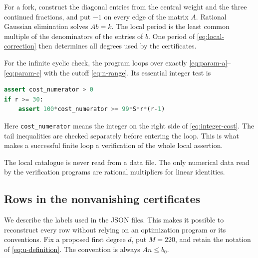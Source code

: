 \documentclass[12pt,a4paper]{article}
\numberwithin{equation}{section}
\theoremstyle{definition}
\begin{document}
For a fork, construct the diagonal entries from the central weight
and the three continued fractions, and put \(-1\) on every edge of
the matrix \(A\). Rational Gaussian elimination solves \(Ab=k\).
The local period is the least common multiple of the denominators
of the entries of \(b\). One period of
\eqref{eq:local-correction} then determines all degrees used by
the certificates.

For the infinite cyclic check, the program loops over exactly
\eqref{eq:param-a}--\eqref{eq:param-c} with the cutoff
\eqref{eq:n-range}. Its essential integer test is
\begin{lstlisting}[language=Python]
assert cost_numerator > 0
if r >= 30:
    assert 100*cost_numerator >= 99*S*r*(r-1)
\end{lstlisting}
Here \texttt{cost\_numerator} means the integer on the right side of
\eqref{eq:integer-cost}. The tail inequalities are checked separately
before entering the loop. This is what makes a successful finite
loop a verification of the whole local assertion.

The local catalogue is never read from a data file.
The only numerical data read by the verification programs are
rational multipliers for linear identities.

\subsection{Rows in the nonvanishing certificates}

We describe the labels used in the JSON files. This makes it
possible to reconstruct every row without relying on an
optimization program or its conventions.
Fix a proposed first degree \(d\), put \(M=220\), and retain
the notation of \eqref{eq:u-definition}.
The convention is always \(A n\leq b_0\).
\end{document}
